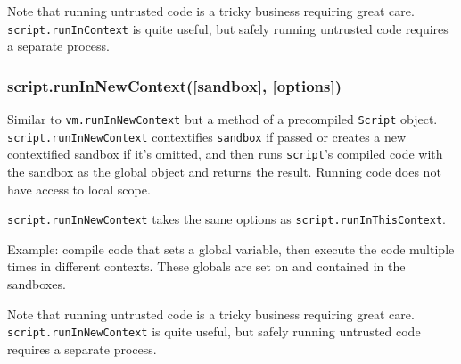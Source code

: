 Note that running untrusted code is a tricky business requiring great
care. \texttt{script.runInContext} is quite useful, but safely running
untrusted code requires a separate process.

\subsubsection{script.runInNewContext({[}sandbox{]},
{[}options{]})}\label{script.runinnewcontextsandbox-options}

Similar to \texttt{vm.runInNewContext} but a method of a precompiled
\texttt{Script} object. \texttt{script.runInNewContext} contextifies
\texttt{sandbox} if passed or creates a new contextified sandbox if it's
omitted, and then runs \texttt{script}'s compiled code with the sandbox
as the global object and returns the result. Running code does not have
access to local scope.

\texttt{script.runInNewContext} takes the same options as
\texttt{script.runInThisContext}.

Example: compile code that sets a global variable, then execute the code
multiple times in different contexts. These globals are set on and
contained in the sandboxes.

\begin{Shaded}
\begin{Highlighting}[]
 \NormalTok{(}\NormalTok{);}
 \NormalTok{(}\NormalTok{);}

 

  \NormalTok{(}\NormalTok{);}

\NormalTok{(} 
\NormalTok{\});}

\NormalTok{(}

\end{Highlighting}
\end{Shaded}

Note that running untrusted code is a tricky business requiring great
care. \texttt{script.runInNewContext} is quite useful, but safely
running untrusted code requires a separate process.
